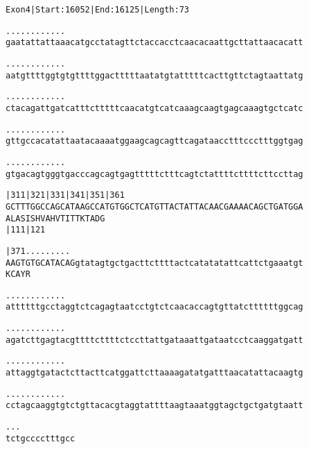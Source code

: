 \documentclass{article}
\begin{document}
\begin{alltt}
Exon 4 | Start: 16052 | End: 16125 | Length: 73

.    .    .    .    .    .    .    .    .    .    .    .    
gaatattattaaacatgcctatagttctaccacctcaacacaattgcttattaacacatt

.    .    .    .    .    .    .    .    .    .    .    .    
aatgttttggtgtgttttggactttttaatatgtatttttcacttgttctagtaattatg

.    .    .    .    .    .    .    .    .    .    .    .    
ctacagattgatcatttctttttcaacatgtcatcaaagcaagtgagcaaagtgctcatc

.    .    .    .    .    .    .    .    .    .    .    .    
gttgccacatattaatacaaaatggaagcagcagttcagataacctttccctttggtgag

.    .    .    .    .    .    .    .    .    .    .    .    
gtgacagtgggtgacccagcagtgagtttttctttcagtctattttcttttcttccttag

    |311      |321      |331      |341      |351      |361  
GCTTTGGCCAGCATAAGCCATGTGGCTCATGTTACTATTACAACGAAAACAGCTGATGGA
A  L  A  S  I  S  H  V  A  H  V  T  I  T  T  K  T  A  D  G  
                        |111                          |121  

    |371          .    .    .    .    .    .    .    .    . 
AAGTGTGCATACAGgtatagtgctgacttcttttactcatatatattcattctgaaatgt
K  C  A  Y  R                                               

   .    .    .    .    .    .    .    .    .    .    .    . 
attttttgcctaggtctcagagtaatcctgtctcaacaccagtgttatcttttttggcag

   .    .    .    .    .    .    .    .    .    .    .    . 
agatcttgagtacgttttcttttctccttattgataaattgataatcctcaaggatgatt

   .    .    .    .    .    .    .    .    .    .    .    . 
attaggtgatactcttacttcatggattcttaaaagatatgatttaacatattacaagtg

   .    .    .    .    .    .    .    .    .    .    .    . 
cctagcaaggtgtctgttacacgtaggtattttaagtaaatggtagctgctgatgtaatt

   .    .    .
tctgcccctttgcc
\end{alltt}
\newpage
\end{document}
